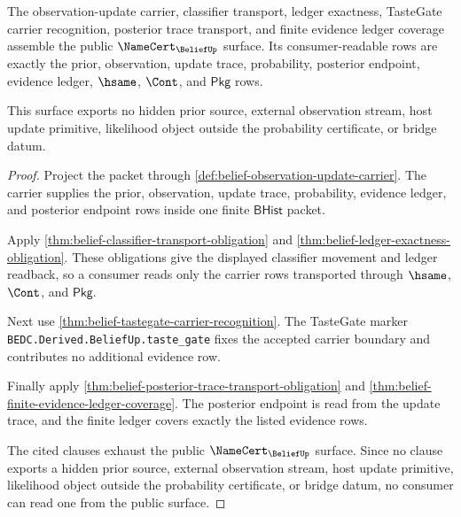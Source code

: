 \begin{theorem}
\label{thm:belief-public-namecert-surface}
The observation-update carrier, classifier transport, ledger exactness,
TasteGate carrier recognition, posterior trace transport, and finite evidence
ledger coverage assemble the public $\NameCert_{\BeliefUp}$ surface. Its
consumer-readable rows are exactly the prior, observation, update trace,
probability, posterior endpoint, evidence ledger, $\hsame$, $\Cont$, and
$\mathsf{Pkg}$ rows.

This surface exports no hidden prior source, external observation stream,
host update primitive, likelihood object outside the probability certificate,
or bridge datum.
\end{theorem}
\begin{proof}
Project the packet through
\autoref{def:belief-observation-update-carrier}. The carrier supplies the
prior, observation, update trace, probability, evidence ledger, and posterior
endpoint rows inside one finite $\mathsf{BHist}$ packet.

Apply \autoref{thm:belief-classifier-transport-obligation} and
\autoref{thm:belief-ledger-exactness-obligation}. These obligations give the
displayed classifier movement and ledger readback, so a consumer reads only the
carrier rows transported through $\hsame$, $\Cont$, and $\mathsf{Pkg}$.

Next use \autoref{thm:belief-tastegate-carrier-recognition}. The TasteGate
marker \texttt{BEDC.Derived.BeliefUp.taste\_gate} fixes the accepted carrier
boundary and contributes no additional evidence row.

Finally apply \autoref{thm:belief-posterior-trace-transport-obligation} and
\autoref{thm:belief-finite-evidence-ledger-coverage}. The posterior endpoint is
read from the update trace, and the finite ledger covers exactly the listed
evidence rows.

The cited clauses exhaust the public $\NameCert_{\BeliefUp}$ surface. Since no
clause exports a hidden prior source, external observation stream, host update
primitive, likelihood object outside the probability certificate, or bridge
datum, no consumer can read one from the public surface.
\end{proof}

